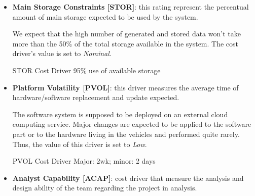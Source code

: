\begin{itemize}
	\begin{costdriverstable}{TIME Cost Driver}
		 {95\% use of available execution time}\hline
	\end{costdriverstable}

	\item \textbf{Main Storage Constraints [STOR]}: this rating represent the percentual amount of main storage expected to be used by the system.

We expect that the high number of generated and stored data won't take more than the 50\% of the total storage available in the system.
The cost driver's value is set to \textit{Nominal}.

	\begin{costdriverstable}{STOR Cost Driver}
		 {95\% use of available storage}\hline
	\end{costdriverstable}

	\item \textbf{Platform Volatility [PVOL]}: this driver measures the average time of hardware/software replacement and update expected.

The software system is supposed to be deployed on an external cloud computing service. Major changes are expected to be applied to the software part or to the hardware living in the vehicles and performed quite rarely. Thus, the value of this driver is set to \textit{Low}.

	\begin{costdriverstable}{PVOL Cost Driver}
			{Major: 2wk; minor: 2 days}{}\hline
	\end{costdriverstable}

	\item \textbf{Analyst Capability [ACAP]}: cost driver that measure the analysis and design ability of the team regarding the project in analysis.


\end{itemize}
